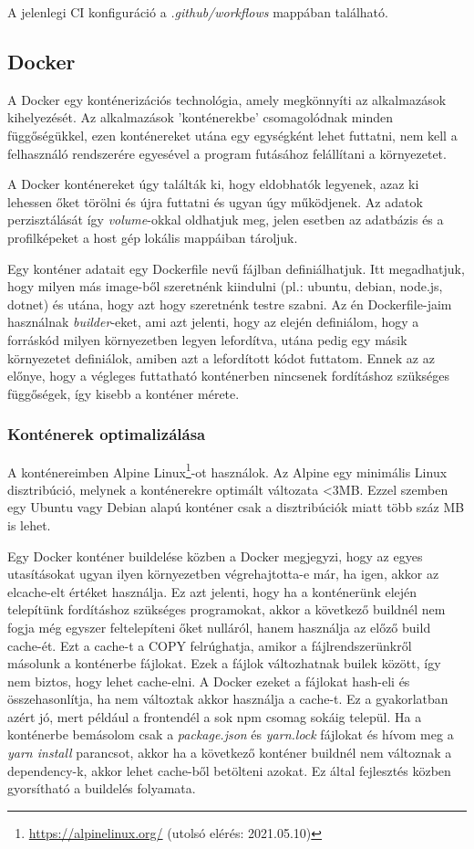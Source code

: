 A jelenlegi CI konfiguráció a \textit{.github/workflows} mappában található.

\subsection{Docker}
A Docker egy konténerizációs technológia, amely megkönnyíti az alkalmazások kihelyezését. Az alkalmazások 'konténerekbe' csomagolódnak minden függőségükkel, ezen konténereket utána egy egységként lehet futtatni, nem kell a felhasználó rendszerére egyesével a program futásához felállítani a környezetet.

A Docker konténereket úgy találták ki, hogy eldobhatók legyenek, azaz ki lehessen őket törölni és újra futtatni és ugyan úgy működjenek. Az adatok perzisztálását így \textit{volume}-okkal oldhatjuk meg, jelen esetben az adatbázis és a profilképeket a host gép lokális mappáiban tároljuk.

Egy konténer adatait egy Dockerfile nevű fájlban definiálhatjuk. Itt megadhatjuk, hogy milyen más image-ből szeretnénk kiindulni (pl.: ubuntu, debian, node.js, dotnet) és utána, hogy azt hogy szeretnénk testre szabni. Az én Dockerfile-jaim használnak \textit{builder}-eket, ami azt jelenti, hogy az elején definiálom, hogy a forráskód milyen környezetben legyen lefordítva, utána pedig egy másik környezetet definiálok, amiben azt a lefordított kódot futtatom. Ennek az az előnye, hogy a végleges futtatható konténerben nincsenek fordításhoz szükséges függőségek, így kisebb a konténer mérete.

\subsubsection{Konténerek optimalizálása}

A konténereimben Alpine Linux\footnote{\url{https://alpinelinux.org/} (utolsó elérés: 2021.05.10)}-ot használok. Az Alpine egy minimális Linux disztribúció, melynek a konténerekre optimált változata <3MB. Ezzel szemben egy Ubuntu vagy Debian alapú konténer csak a disztribúciók miatt több száz MB is lehet.

Egy Docker konténer buildelése közben a Docker megjegyzi, hogy az egyes utasításokat ugyan ilyen környezetben végrehajtotta-e már, ha igen, akkor az elcache-elt értéket használja. Ez azt jelenti, hogy ha a konténerünk elején telepítünk fordításhoz szükséges programokat, akkor a következő buildnél nem fogja még egyszer feltelepíteni őket nulláról, hanem használja az előző build cache-ét. Ezt a cache-t a COPY felrúghatja, amikor a fájlrendszerünkről másolunk a konténerbe fájlokat. Ezek a fájlok változhatnak builek között, így nem biztos, hogy lehet cache-elni. A Docker ezeket a fájlokat hash-eli és összehasonlítja, ha nem változtak akkor használja a cache-t. Ez a gyakorlatban azért jó, mert például a frontendél a sok npm csomag sokáig települ. Ha a konténerbe bemásolom csak a \textit{package.json} és \textit{yarn.lock} fájlokat és hívom meg a \textit{yarn install} parancsot, akkor ha a következő konténer buildnél nem változnak a dependency-k, akkor lehet cache-ből betölteni azokat. Ez által fejlesztés közben gyorsítható a buildelés folyamata.

